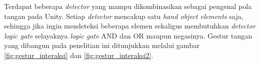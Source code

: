 		Terdapat beberapa \textit{detector} yang mampu dikombinasikan sebagai pengenal pola tangan pada Unity. Setiap \textit{detector} mencakup satu \textit{hand object elements} saja, sehingga jika ingin mendeteksi beberapa elemen sekaligus membutuhkan \textit{detector logic gate} selayaknya \textit{logic gate} AND dan OR maupun negasinya. Gestur tangan yang dibangun pada penelitian ini ditunjukkan melalui gambar \ref{fig:gestur_interaksi} dan \ref{fig:gestur_interaksi2}.
		\begin{figure} [H]
			\hspace{0.1em}
			\hspace{0.1em}

\end{figure}
